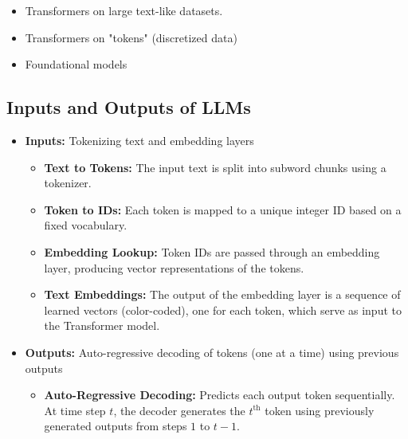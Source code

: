 \begin{notes}
    \begin{itemize}
        \item Transformers on large text-like datasets.
        \item Transformers on "tokens" (discretized data)
        \item Foundational models
    \end{itemize}
\end{notes}

\subsection{Inputs and Outputs of LLMs}
\begin{notes}
    \begin{itemize}
        \item \textbf{Inputs:} Tokenizing text and embedding layers
        \vspace{-1em}
        \begin{itemize}        
            \item \textbf{Text to Tokens:} The input text is split into subword chunks using a tokenizer.
            \item \textbf{Token to IDs:} Each token is mapped to a unique integer ID based on a fixed vocabulary.
            \item \textbf{Embedding Lookup:} Token IDs are passed through an embedding layer, producing vector representations of the tokens.
            \item \textbf{Text Embeddings:} The output of the embedding layer is a sequence of learned vectors (color-coded), one for each token, which serve as input to the Transformer model.
        \end{itemize}        
        \item \textbf{Outputs:} Auto-regressive decoding of tokens (one at a time) using previous outputs
        \vspace{-1em}
        \begin{itemize}
            \item \textbf{Auto-Regressive Decoding:} Predicts each output token sequentially. At time step $t$, the decoder generates the $t^\text{th}$ token using previously generated outputs from steps $1$ to $t-1$.
        \end{itemize}        
    \end{itemize}
\end{notes}
\newpage

